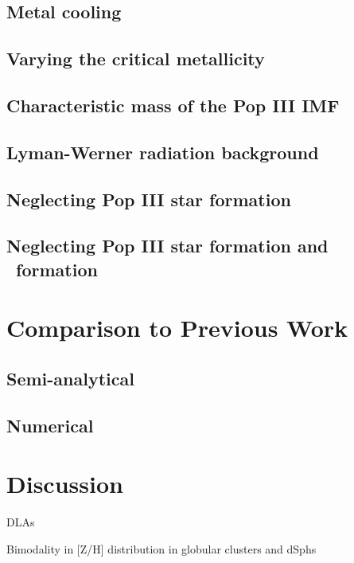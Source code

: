 \documentclass[useAMS,usenatbib]{mn2e}
\begin{document}
\subsection{Metal cooling}

\subsection{Varying the critical metallicity}

\subsection{Characteristic mass of the Pop III IMF}

\subsection{Lyman-Werner radiation background}

\subsection{Neglecting Pop III star formation}

\subsection{Neglecting Pop III star formation and \hh~formation}

\section{Comparison to Previous Work}
\label{sec:compare}

\subsection{Semi-analytical}

\subsection{Numerical}

\section{Discussion}
\label{sec:discuss}

\li DLAs

\li Bimodality in [Z/H] distribution in globular clusters and dSphs
\end{document}
